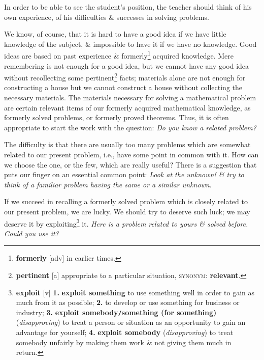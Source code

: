 \documentclass[oneside]{book}
\numberwithin{equation}{section}
\begin{document}
In order to be able to see the student's position, the teacher should think of his own experience, of his difficulties \& successes in solving problems.

We know, of course, that it is hard to have a good idea if we have little knowledge of the subject, \& impossible to have it if we have no knowledge. Good ideas are based on past experience \& formerly\footnote{\textbf{formerly} [adv] in earlier times.} acquired knowledge. Mere remembering is not enough for a good idea, but we cannot have any good idea without recollecting some pertinent\footnote{\textbf{pertinent} [a] appropriate to a particular situation, \textsc{synonym}: \textbf{relevant}.} facts; materials alone are not enough for constructing a house but we cannot construct a house without collecting the necessary materials. The materials necessary for solving a mathematical problem are certain relevant items of our formerly acquired mathematical knowledge, as formerly solved problems, or formerly proved theorems. Thus, it is often appropriate to start the work with the question: \textit{Do you know a related problem?}

The difficulty is that there are usually too many problems which are somewhat related to our present problem, i.e., have some point in common with it. How can we choose the one, or the few, which are really useful? There is a suggestion that puts our finger on an essential common point: \textit{Look at the unknown! \& try to think of a familiar problem having the same or a similar unknown}.

If we succeed in recalling a formerly solved problem which is closely related to our present problem, we are lucky. We should try to deserve such luck; we may deserve it by exploiting\footnote{\textbf{exploit} [v] \textbf{1.} \textbf{exploit something} to use something well in order to gain as much from it as possible; \textbf{2.} to develop or use something for business or industry; \textbf{3.} \textbf{exploit somebody\texttt{/}something (for something)} (\textit{disapproving}) to treat a person or situation as an opportunity to gain an advantage for yourself; \textbf{4.} \textbf{exploit somebody} (\textit{disapproving}) to treat somebody unfairly by making them work \& not giving them much in return.} it. \textit{Here is a problem related to yours \& solved before. Could you use it?}
\end{document}

